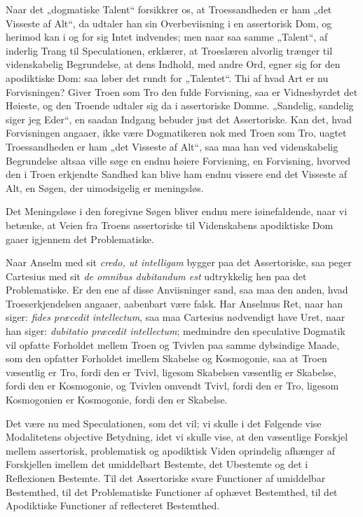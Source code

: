 \documentclass[12pt]{book}
\newcommand{\opage}[1]{\marginnote{\footnotesize\textit{[#1]}}}
\begin{document}
Naar det „dogmatiske Talent“ forsikkrer os, at Troessandheden
er ham „det Visseste af Alt“, da udtaler han sin
Overbeviisning i en assertorisk Dom, og herimod kan i og
for sig Intet indvendes; men naar saa samme „Talent“, af
inderlig Trang til Speculationen, erklærer, at Troeslæren alvorlig
trænger til videnskabelig Begrundelse, at dens Indhold,
med andre Ord, egner sig for den apodiktiske Dom: saa løber
det rundt for „Talentet“. Thi af hvad Art er nu Forvisningen?
Giver Troen som Tro den fulde Forvisning, saa
er Vidnesbyrdet det Høieste, og den Troende udtaler sig da
i assertoriske Domme. „Sandelig, sandelig siger jeg Eder“,
en saadan Indgang bebuder just det Assertoriske. Kan det,
hvad Forvisningen angaaer, ikke være Dogmatikeren nok med
Troen som Tro, uagtet Troessandheden er ham „det Visseste
af Alt“, saa maa han ved videnskabelig Begrundelse altsaa
ville søge en endnu høiere Forvisning, en Forvisning, hvorved
den i Troen erkjendte Sandhed kan blive ham endnu
vissere end det Visseste af Alt, en Søgen, der uimodsigelig
er meningsløs.

\opage{180}Det Meningsløse i den foregivne Søgen bliver endnu
mere iøinefaldende, naar vi betænke, at Veien fra Troens
assertoriske til Videnskabens apodiktiske Dom gaaer igjennem
det Problematiske.

Naar Anselm med sit \textit{credo, ut intelligam} bygger paa
det Assertoriske, saa peger Cartesius med sit \textit{de omnibus
dubitandum est} udtrykkelig hen paa det Problematiske. Er
den ene af disse Anviisninger sand, saa maa den anden, hvad
Troeserkjendelsen angaaer, aabenbart være falsk. Har Anselmus
Ret, naar han siger: \textit{fides præcedit intellectum}, saa maa
Cartesius nødvendigt have Uret, naar han siger: \textit{dubitatio
præcedit intellectum}; medmindre den speculative Dogmatik
vil opfatte Forholdet mellem Troen og Tvivlen paa samme
dybsindige Maade, som den opfatter Forholdet imellem Skabelse
og Kosmogonie, saa at Troen væsentlig er Tro, fordi den er
Tvivl, ligesom Skabelsen væsentlig er Skabelse, fordi den er
Kosmogonie, og Tvivlen omvendt Tvivl, fordi den er
Tro, ligesom Kosmogonien er Kosmogonie, fordi den er
Skabelse.

Det være nu med Speculationen, som det vil; vi skulle
i det Følgende vise Modalitetens objective Betydning, idet vi
skulle vise, at den væsentlige Forskjel mellem assertorisk, problematisk
og apodiktisk Viden oprindelig afhænger af Forskjellen
imellem det umiddelbart Bestemte, det Ubestemte og det i Reflexionen
Bestemte. Til det Assertoriske svare Functioner af
umiddelbar Bestemthed, til det Problematiske Functioner af
ophævet Bestemthed, til det Apodiktiske Functioner af reflecteret
Bestemthed.
\end{document}
